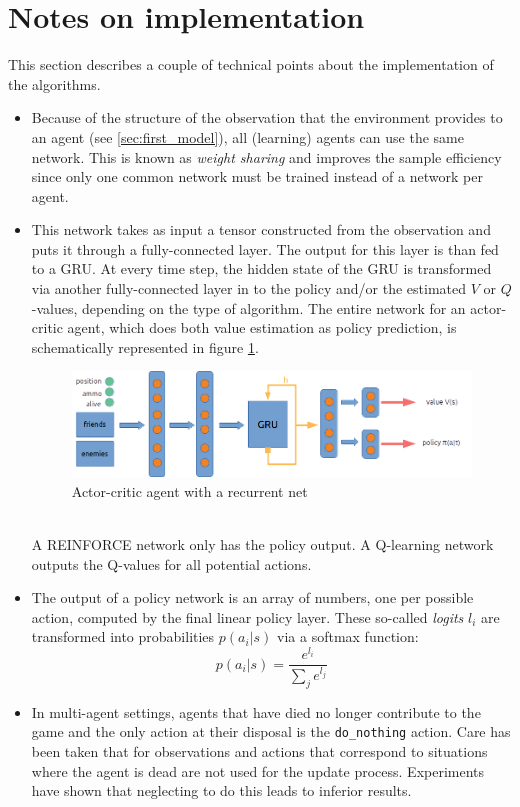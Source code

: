 \section{Notes on implementation}
This section describes a couple of technical points about the implementation of the algorithms.
\begin{itemize}
    \item Because of the structure of the observation that the environment provides to an agent (see \ref{sec:first_model}), all (learning) agents can use the same network. This is known as \emph{weight sharing} and improves the sample efficiency since only one common network must be trained instead of a network per agent.
    \item This network takes as input a tensor constructed from the observation and puts it through a fully-connected layer. The output for this layer is than fed to a GRU. At every time step, the hidden state of the GRU is transformed via another fully-connected layer in to the policy and/or the estimated $V$ or $Q$-values, depending on the type of algorithm. The entire network for an actor-critic agent, which does both value estimation as policy prediction, is schematically represented in figure \ref{fig:agent_net}. 
    \begin{figure}[htp]
        \centering
        \includegraphics[width=14cm]{images/agent_net2.png}
        \caption{Actor-critic agent with a recurrent net}
        \label{fig:agent_net}
    \end{figure}
    \\A REINFORCE network only has the policy output. A Q-learning network outputs the Q-values for all potential actions.
    \item
        The output of a policy network is an array of numbers, one per possible action, computed by the final linear policy layer. These so-called \emph{logits} $l_i$ are transformed into probabilities $p(a_i | s)$ via a softmax function:
        \begin{equation}
            p(a_i | s) = \frac{e^{l_i}}{\sum_j e^{l_j}}
        \end{equation}
    \item In multi-agent settings, agents that have died no longer contribute to the game and the only action at their disposal is the {\tt do\_nothing} action. Care has been taken that for observations and actions that correspond to situations where the agent is dead are not used for the update process. Experiments have shown that neglecting to do this leads to inferior results.

\end{itemize}
